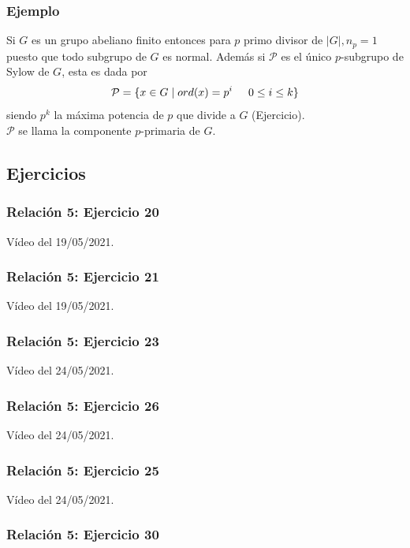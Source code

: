 \documentclass[11pt,a4paper]{article}
\begin{document}
\subsubsection*{Ejemplo}

Si $G$ es un grupo abeliano finito entonces para $p$ primo divisor de $|G|, n_{p} = 1$ puesto que todo subgrupo de $G$ es normal. Además si $\mathcal{P}$ es el único $p$-subgrupo de Sylow de $G$, esta es dada por
$$\mathcal{P} = \{x \in G \mid ord(x) = p^{i} \hspace{0.5cm} 0 \leq i \leq k\}$$
siendo $p^{k}$ la máxima potencia de $p$ que divide a $G$ (Ejercicio). \\
$\mathcal{P}$ se llama la componente $p$-primaria de $G$.

\subsection{Ejercicios}

\subsubsection*{Relación 5: Ejercicio 20}

Vídeo del 19/05/2021.

\subsubsection*{Relación 5: Ejercicio 21}

Vídeo del 19/05/2021.


\subsubsection*{Relación 5: Ejercicio 23}

Vídeo del 24/05/2021.

\subsubsection*{Relación 5: Ejercicio 26}

Vídeo del 24/05/2021.

\subsubsection*{Relación 5: Ejercicio 25}

Vídeo del 24/05/2021.

\subsubsection*{Relación 5: Ejercicio 30}
\end{document}
